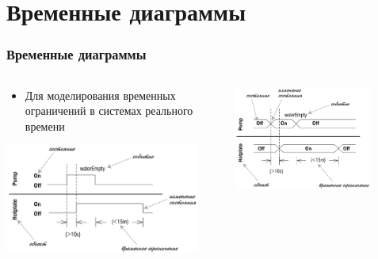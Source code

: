 \documentclass{../mcsslides}
\begin{document}
    \section{Временные диаграммы}

    \begin{frame}
        \frametitle{Временные диаграммы}
        \begin{columns}
            \begin{column}{0.5\textwidth}
                \begin{itemize}
                    \item Для моделирования временных ограничений в системах реального времени
                \end{itemize}
                \vspace{3mm}
                \begin{center}
                    \includegraphics[width=0.9\textwidth]{timingDiagrams.png}
                \end{center}
            \end{column}
            \begin{column}{0.5\textwidth}
                \begin{center}
                    \includegraphics[width=0.8\textwidth]{timingDiagramsAlternate.png}
                \end{center}
            \end{column}
        \end{columns}
    \end{frame}
\end{document}
